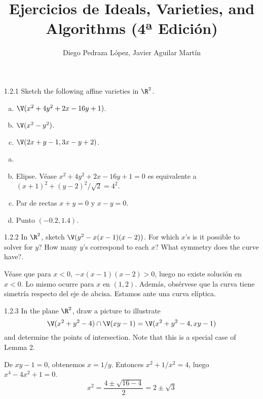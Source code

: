 \documentclass[twoside]{article}
\begin{document}
\title{Ejercicios de Ideals, Varieties, and Algorithms (4ª Edición)}
\author{Diego Pedraza López, Javier Aguilar Martín}
\maketitle

\begin{ejercicio}{1.2.1}
Sketch the following affine varieties in $\R^2$.
\begin{enumerate}[a.]
\item $\V(x^2+4y^2+2x-16y+1)$.
\item $\V(x^2-y^2)$.
\item $\V(2x+y-1,3x-y+2)$.
\end{enumerate}
\end{ejercicio}
\begin{solucion}
\begin{enumerate}[a.]
\item[]
\item Elipse. Véase $x^2+4y^2+2x-16y+1=0$ es equivalente a $(x+1)^2+(y-2)^2/\sqrt{2}=4^2$.
\item Par de rectas $x+y=0$ y $x-y=0$.
\item Punto $(-0.2,1.4)$.
\end{enumerate}
\end{solucion}

\newpage

\begin{ejercicio}{1.2.2}
In $\R^2$, sketch $\V(y^2-x(x-1)(x-2))$.
For which $x$'s is it possible to solver for $y$?
How many $y$'s correspond to each $x$?
What symmetry does the curve have?.
\end{ejercicio}
\begin{solucion}
Véase que para $x<0$, $-x(x-1)(x-2)>0$, luego no existe solución en $x<0$.
Lo mismo ocurre para $x$ en $(1,2)$.
Además, obsérvese que la curva tiene simetría respecto del eje de abcisa.
Estamos ante una curva elíptica.
\end{solucion}

\newpage

\begin{ejercicio}{1.2.3}
In the plane $\R^2$, draw a picture to illustrate
\[ \V(x^2+y^2-4) \cap \V(xy-1) = \V(x^2+y^2-4,xy-1) \]
and determine the points of intersection. Note that this is a special case of Lemma 2.
\end{ejercicio}
\begin{solucion}
De $xy-1=0$, obtenemos $x=1/y$. Entonces $x^2+1/x^2=4$, luego $x^4-4x^2+1=0$.
\[ x^2 = \frac{4 \pm \sqrt{16-4}}{2} = 2 \pm \sqrt{3} \]
\end{solucion}
\end{document}
